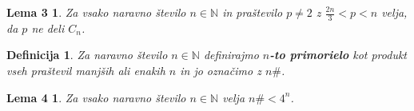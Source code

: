 \documentclass{beamer}
\newtheorem{definicija}{Definicija}
\newtheorem{lema3}{Lema 3}
\newtheorem{lema4}{Lema 4}
\def\N{\mathbb{N}}
\begin{document}
\begin{frame}
    \begin{lema3}
        \label{lema3}
        Za vsako naravno število $n \in \N$ in praštevilo $p \neq 2$ z $\frac{2n}{3} < p < n$ velja, da $p$ ne deli $C_n$. 
    \end{lema3}
    \pause
    \medskip
    \begin{definicija}
        Za naravno število $n \in \N$ definirajmo \textbf{$n$-to primorielo} kot produkt vseh praštevil manjših ali enakih $n$ in jo označimo z $n\#$.
    \end{definicija}
    \pause
    \medskip
    \begin{lema4}
        \label{lema4}
        Za vsako naravno število $n \in \N$ velja $n\# < 4^n$. 
    \end{lema4}
\end{frame}
\end{document}
